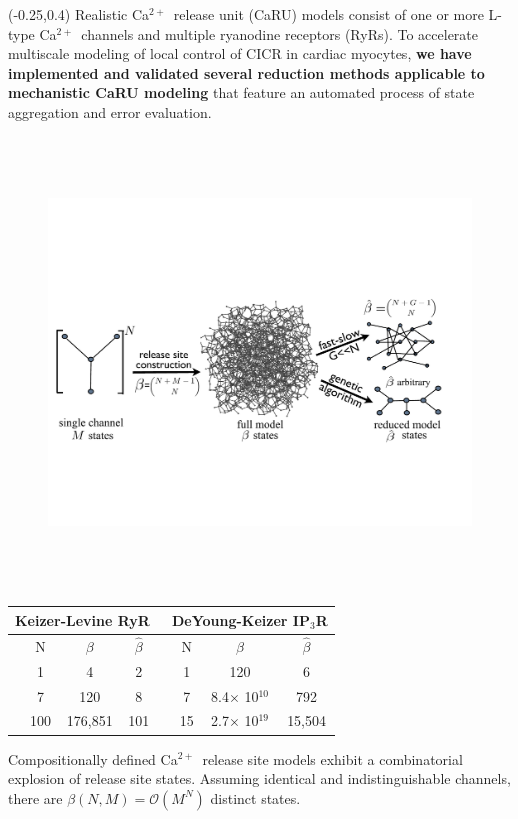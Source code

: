 \documentclass[a0]{a0poster}
\def\Ca{Ca$^{2+}$}
\def\Head#1{\noindent{\begin{center}\LARGE\color{DarkBlue} #1\end{center}}}
\begin{document}
\begin{textblock}{7.5}(-0.25,0.4)
\Head{--- Introduction ---}
\vspace{-0.1in}
\large
Realistic \Ca\ release unit (CaRU) models consist of one or more L-type \Ca\ channels and multiple ryanodine receptors (RyRs). To accelerate multiscale modeling of local control of CICR in cardiac myocytes, {\bf we have implemented and validated several reduction methods applicable to mechanistic CaRU modeling} that feature an automated process of state aggregation and error evaluation. 
\vspace{-0.05in}
\begin{center}
\begin{figure}
\includegraphics*[height=4.7in]{pics/Fig1_1}
\end{figure}
\end{center}

\begin{table}
\begin{center}
\vspace{-0.25in}
\begin{tabular}{|cccc|cccc|}
\hline \multicolumn{4}{c}{ Keizer-Levine RyR } \vline& \multicolumn{4}{c}{\ DeYoung-Keizer IP$_3$R} \\
\hline
& N & $\beta$ & $\hat{\beta}$ & & N & $\beta$ & $\hat{\beta}$ \\
\hline
& 1 & 4 & 2 &  & 1 & 120 & 6\\
& 7 & 120 & 8 & & 7 & 8.4$\times$ 10$^{10}$  & 792\\
& 100 & 176,851 & 101 &  & 15 & 2.7$\times$ 10$^{19}$& 15,504\\
\hline 
\end{tabular}
\end{center}
\end{table}
\vspace{-0.35in}
\large Compositionally defined \Ca\ release site models exhibit a combinatorial explosion of release site states. Assuming identical and indistinguishable channels, there are $\beta(N, M) = 
\mathcal{O} (M^N)$ distinct states. 
\end{textblock}
\end{document}
